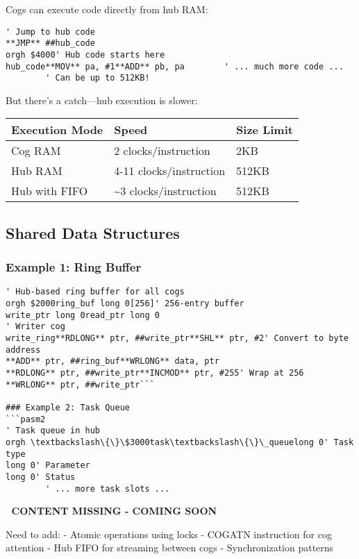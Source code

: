 \documentclass[11pt]{book}
\providecommand{\toprule}{\hline}
\providecommand{\midrule}{\hline}
\providecommand{\bottomrule}{\hline}
\begin{document}
Cogs can execute code directly from hub RAM:

\begin{lstlisting}
' Jump to hub code
**JMP** ##hub_code        
orgh $4000' Hub code starts here
hub_code**MOV** pa, #1**ADD** pb, pa        ' ... much more code ...
        ' Can be up to 512KB!
\end{lstlisting}

But there's a catch---hub execution is slower:

\begin{longtable}[]{@{}lll@{}}
\toprule
Execution Mode & Speed & Size Limit \\
\midrule
\endhead
Cog RAM & 2 clocks/instruction & 2KB \\
Hub RAM & 4-11 clocks/instruction & 512KB \\
Hub with FIFO & \textasciitilde3 clocks/instruction & 512KB \\
\bottomrule
\end{longtable}

\hypertarget{shared-data-structures}{%
\subsection{Shared Data Structures}\label{shared-data-structures}}

\hypertarget{example-1-ring-buffer}{%
\subsubsection{Example 1: Ring Buffer}\label{example-1-ring-buffer}}

\begin{lstlisting}
' Hub-based ring buffer for all cogs
orgh $2000ring_buf long 0[256]' 256-entry buffer
write_ptr long 0read_ptr long 0
' Writer cog
write_ring**RDLONG** ptr, ##write_ptr**SHL** ptr, #2' Convert to byte address
**ADD** ptr, ##ring_buf**WRLONG** data, ptr        
**RDLONG** ptr, ##write_ptr**INCMOD** ptr, #255' Wrap at 256
**WRLONG** ptr, ##write_ptr```

### Example 2: Task Queue
```pasm2
' Task queue in hub
orgh \textbackslash\{\}\$3000task\textbackslash\{\}\_queuelong 0' Task type
long 0' Parameter
long 0' Status
        ' ... more task slots ...
\end{lstlisting}

\begin{missing}
🚧 \textbf{CONTENT MISSING - COMING SOON}

Need to add:
- Atomic operations using locks
- COGATN instruction for cog attention
- Hub FIFO for streaming between cogs
- Synchronization patterns
\end{missing}
\end{document}

